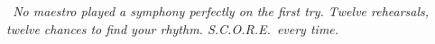 {\vspace{2mm}

\begin{tcolorbox}[
    enhanced,
    colback=musBurgundy!5,
    colframe=musBurgundy!20,
    arc=6pt, boxrule=0.8pt,
    left=5mm, right=5mm, top=3mm, bottom=3mm,
]
    \begin{minipage}[c]{0.07\linewidth}
        \centering \iconOwl[1cm]
    \end{minipage}%
    \hfill
    \begin{minipage}[c]{0.90\linewidth}
        \small\itshape\color{musBlack}
        \faQuoteLeft~No maestro played a symphony perfectly
        on the first try. Twelve rehearsals, twelve chances
        to find your rhythm. S.C.O.R.E.\ every time.~\faQuoteRight
    \end{minipage}
\end{tcolorbox}

}

\newpage

